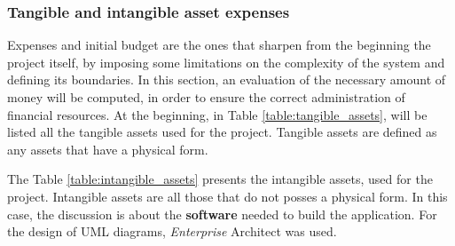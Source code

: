 \subsubsection{Tangible and intangible asset expenses}
Expenses and initial budget are the ones that sharpen from the beginning the project itself, by imposing some limitations on the complexity of the system and defining its boundaries. In this section, an evaluation of the necessary amount of money will be computed, in order to ensure the correct administration of financial resources. At the beginning, in Table \ref{table:tangible_assets}, will be listed all the tangible assets used for the project. Tangible assets are defined as any assets that have a physical form. 

\begin{table}[H]
\centering
\caption{Tangible assets expenses}
\label{table:tangible_assets}
\end{table}

The Table \ref{table:intangible_assets} presents the intangible assets, used for the project. Intangible assets are all those that do not posses a physical form. In this case, the discussion is about the \textbf{software} needed to build the application. For the design of UML diagrams, \emph{Enterprise} Architect was used.

\begin{table}[H]
\centering
\caption{Intangible asset expenses}
\label{table:intangible_assets}
\end{table}

